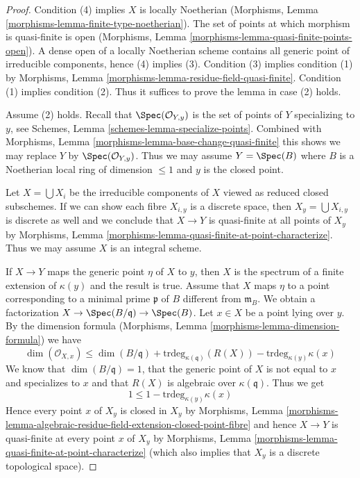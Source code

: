 \begin{proof}
Condition (4) implies $X$ is locally Noetherian
(Morphisms, Lemma \ref{morphisms-lemma-finite-type-noetherian}).
The set of points at which morphism is quasi-finite is open
(Morphisms, Lemma \ref{morphisms-lemma-quasi-finite-points-open}).
A dense open of a locally Noetherian scheme contains all generic
point of irreducible components, hence (4) implies (3).
Condition (3) implies condition
(1) by Morphisms, Lemma \ref{morphisms-lemma-residue-field-quasi-finite}.
Condition (1) implies condition (2).
Thus it suffices to prove the lemma in case (2) holds.

\medskip\noindent
Assume (2) holds. Recall that $\Spec(\mathcal{O}_{Y, y})$
is the set of points of $Y$ specializing to $y$, see
Schemes, Lemma \ref{schemes-lemma-specialize-points}.
Combined with
Morphisms, Lemma \ref{morphisms-lemma-base-change-quasi-finite}
this shows we may replace $Y$ by $\Spec(\mathcal{O}_{Y, y})$.
Thus we may assume $Y = \Spec(B)$ where $B$ is a Noetherian
local ring of dimension $\leq 1$ and $y$ is the closed point.

\medskip\noindent
Let $X = \bigcup X_i$ be the irreducible components of $X$ viewed
as reduced closed subschemes. If we can show each fibre $X_{i, y}$
is a discrete space, then $X_y = \bigcup X_{i, y}$ is discrete as
well and we conclude that $X \to Y$ is quasi-finite at all points
of $X_y$ by Morphisms, Lemma
\ref{morphisms-lemma-quasi-finite-at-point-characterize}.
Thus we may assume $X$ is an integral scheme.

\medskip\noindent
If $X \to Y$ maps the generic point $\eta$ of $X$ to $y$, then $X$
is the spectrum of a finite extension of $\kappa(y)$ and the
result is true. Assume that $X$ maps $\eta$ to a point corresponding
to a minimal prime $\mathfrak p$ of $B$ different from $\mathfrak m_B$.
We obtain a factorization $X \to \Spec(B/\mathfrak q) \to \Spec(B)$.
Let $x \in X$ be a point lying over $y$.
By the dimension formula
(Morphisms, Lemma \ref{morphisms-lemma-dimension-formula})
we have
$$
\dim(\mathcal{O}_{X, x}) \leq \dim(B/\mathfrak q) +
\text{trdeg}_{\kappa(\mathfrak q)}(R(X)) - \text{trdeg}_{\kappa(y)} \kappa(x)
$$
We know that $\dim(B/\mathfrak q) = 1$, that the generic point of $X$
is not equal to $x$ and specializes to $x$ and that $R(X)$ is algebraic
over $\kappa(\mathfrak q)$. Thus we get
$$
1 \leq 1 - \text{trdeg}_{\kappa(y)} \kappa(x)
$$
Hence every point $x$ of $X_y$ is closed in $X_y$ by
Morphisms, Lemma
\ref{morphisms-lemma-algebraic-residue-field-extension-closed-point-fibre}
and hence $X \to Y$ is quasi-finite at every point $x$ of $X_y$ by
Morphisms, Lemma \ref{morphisms-lemma-quasi-finite-at-point-characterize}
(which also implies that $X_y$ is a discrete topological space).
\end{proof}

